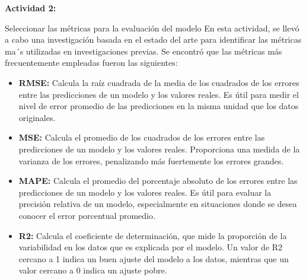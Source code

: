 		
		\textbf{Actividad 2: }
		
		Seleccionar las métricas para la evaluación del modelo
		En esta actividad, se llevó a cabo una investigación basada en el estado del arte para identificar las métricas ma´s utilizadas en investigaciones previas. Se encontró que las métricas más frecuentemente empleadas fueron las siguientes:
		
		
		\begin{itemize}
			\item \textbf{RMSE: } Calcula la raíz cuadrada de la media de los cuadrados de los errores entre las predicciones de un modelo y los valores reales. Es útil para medir el nivel de error promedio de las predicciones en la misma unidad que los datos originales.
			\item \textbf{MSE: } Calcula el promedio de los cuadrados de los errores entre las predicciones de un modelo y los valores reales. Proporciona una medida de la varianza de los errores, penalizando más fuertemente los errores grandes.
			\item \textbf{MAPE: } Calcula el promedio del porcentaje absoluto de los errores entre las predicciones de un modelo y los valores reales. Es útil para evaluar la precisión relativa de un modelo, especialmente en situaciones donde se desea conocer el error porcentual promedio. 
		\item \textbf{R2: } Calcula el coeficiente de determinación, que mide la proporción de la variabilidad en los datos que es explicada por el modelo. Un valor de R2 cercano a 1 indica un buen ajuste del modelo a los datos, mientras que un valor cercano a 0 indica un ajuste pobre.
		\end{itemize}
		
		
		
